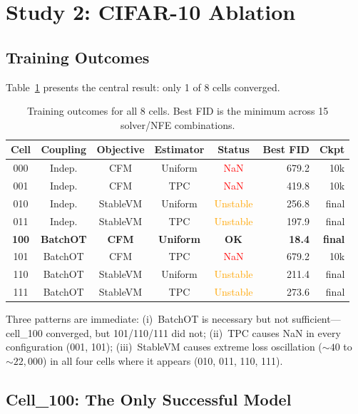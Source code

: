 \section{Study 2: CIFAR-10 Ablation}
\label{sec:study2}

\subsection{Training Outcomes}

Table~\ref{tab:outcomes} presents the central result: only 1 of 8 cells converged.

\begin{table}[H]
\centering
\caption{Training outcomes for all 8 cells. Best FID is the minimum across 15 solver/NFE combinations.}
\label{tab:outcomes}
\small
\begin{tabular}{@{}cccccrr@{}}
\toprule
Cell & Coupling & Objective & Estimator & Status & Best FID & Ckpt \\
\midrule
000 & Indep. & CFM & Uniform & \textcolor{red}{NaN} & 679.2 & 10k \\
001 & Indep. & CFM & TPC & \textcolor{red}{NaN} & 419.8 & 10k \\
010 & Indep. & StableVM & Uniform & \textcolor{orange}{Unstable} & 256.8 & final \\
011 & Indep. & StableVM & TPC & \textcolor{orange}{Unstable} & 197.9 & final \\
\textbf{100} & \textbf{BatchOT} & \textbf{CFM} & \textbf{Uniform} & \textcolor{green!60!black}{\textbf{OK}} & \textbf{18.4} & \textbf{final} \\
101 & BatchOT & CFM & TPC & \textcolor{red}{NaN} & 679.2 & 10k \\
110 & BatchOT & StableVM & Uniform & \textcolor{orange}{Unstable} & 211.4 & final \\
111 & BatchOT & StableVM & TPC & \textcolor{orange}{Unstable} & 273.6 & final \\
\bottomrule
\end{tabular}
\end{table}

Three patterns are immediate: (i)~BatchOT is necessary but not sufficient---cell\_100 converged, but 101/110/111 did not; (ii)~TPC causes NaN in every configuration (001, 101); (iii)~StableVM causes extreme loss oscillation (${\sim}40$ to ${\sim}22{,}000$) in all four cells where it appears (010, 011, 110, 111).

\subsection{Cell\_100: The Only Successful Model}

